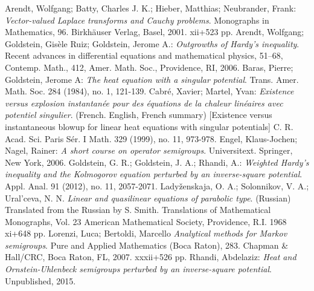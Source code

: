 \documentclass[11pt]{article}
\theoremstyle{break}
\begin{document}
\begin{thebibliography}{tief}
 Arendt, Wolfgang; Batty, Charles J. K.; Hieber, Matthias; Neubrander, Frank:
{\it Vector-valued Laplace transforms and Cauchy problems}.
Monographs in Mathematics, 96. Birkhäuser Verlag, Basel, 2001. xii+523 pp.
 Arendt, Wolfgang; Goldstein, Gisèle Ruiz; Goldstein, Jerome A.: 
{\it Outgrowths of Hardy's inequality}. Recent advances in differential equations and mathematical physics, 51–68,
Contemp. Math., 412, Amer. Math. Soc., Providence, RI, 2006.
 Baras, Pierre; Goldstein, Jerome A:
{\it The heat equation with a singular potential}.
Trans. Amer. Math. Soc. 284 (1984), no. 1, 121-139.
 Cabr\'e, Xavier; Martel, Yvan:
{\it Existence versus explosion instantan\'ee pour des \'equations de la chaleur lin\'eaires avec potentiel singulier}. (French. English, French summary) [Existence versus instantaneous blowup for linear heat equations with singular potentials]
C. R. Acad. Sci. Paris S\'er. I Math. 329 (1999), no. 11, 973-978. 
 Engel, Klaus-Jochen; Nagel, Rainer:
{\it A short course on operator semigroups}. Universitext. Springer, New York, 2006.
 Goldstein, G. R.; Goldstein, J. A.; Rhandi, A.: {\it Weighted Hardy's inequality and the Kolmogorov equation perturbed by an inverse-square potential}.
Appl. Anal. 91 (2012), no. 11, 2057-2071. 
 Lady\v{z}enskaja, O. A.; Solonnikov, V. A.; Ural'ceva, N. N.
{\it Linear and quasilinear equations of parabolic type}. (Russian)
Translated from the Russian by S. Smith. Translations of Mathematical Monographs, Vol. 23 American Mathematical Society, Providence, R.I. 1968 xi+648 pp. 
 Lorenzi, Luca; Bertoldi, Marcello
{\it Analytical methods for Markov semigroups}.
Pure and Applied Mathematics (Boca Raton), 283. Chapman \& Hall/CRC, Boca Raton, FL, 2007. xxxii+526 pp.
 Rhandi, Abdelaziz: {\it Heat and Ornstein-Uhlenbeck semigroups perturbed by an inverse-square potential}. 
                     Unpublished, 2015.
\end{thebibliography} 
\end{document}
